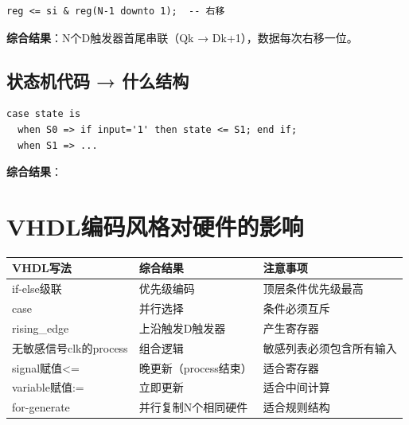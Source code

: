 \begin{lstlisting}
reg <= si & reg(N-1 downto 1);  -- 右移
\end{lstlisting}

\textbf{综合结果}：N个D触发器首尾串联（Qk → Dk+1），数据每次右移一位。

\subsection{状态机代码 → 什么结构}

\begin{lstlisting}
case state is
  when S0 => if input='1' then state <= S1; end if;
  when S1 => ...
\end{lstlisting}

\textbf{综合结果}：

\begin{center}
\end{center}

\section{VHDL编码风格对硬件的影响}

\begin{center}
\begin{tabular}{|l|l|l|}
\hline
\textbf{VHDL写法} & \textbf{综合结果} & \textbf{注意事项} \\
\hline
if-else级联 & 优先级编码 & 顶层条件优先级最高 \\
case & 并行选择 & 条件必须互斥 \\
rising\_edge & 上沿触发D触发器 & 产生寄存器 \\
无敏感信号clk的process & 组合逻辑 & 敏感列表必须包含所有输入 \\
signal赋值<= & 晚更新（process结束）& 适合寄存器 \\
variable赋值:= & 立即更新 & 适合中间计算 \\
for-generate & 并行复制N个相同硬件 & 适合规则结构 \\
\hline
\end{tabular}
\end{center}


